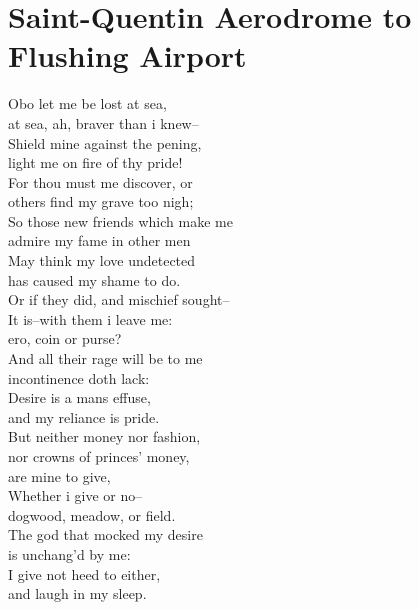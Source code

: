 \documentclass[smalldemyvopaper,11pt,twoside,onecolumn,openright,extrafontsizes]{memoir}
\begin{document}
\chapter{Saint-Quentin Aerodrome to Flushing Airport}
Obo let me be lost at sea,
\\at sea, ah, braver than i knew--
\\Shield mine against the pening,
\\light me on fire of thy pride!
\\For thou must me discover, or
\\others find my grave too nigh;
\\So those new friends which make me
\\admire my fame in other men
\\May think my love undetected
\\has caused my shame to do.
\\Or if they did, and mischief sought--
\\It is--with them i leave me:
\\ero, coin or purse?
\\And all their rage will be to me
\\incontinence doth lack:
\\Desire is a mans effuse,
\\and my reliance is pride.
\\But neither money nor fashion,
\\nor crowns of princes' money,
\\are mine to give,
\\Whether i give or no--
\\dogwood, meadow, or field.
\\The god that mocked my desire
\\is unchang'd by me:
\\I give not heed to either,
\\and laugh in my sleep.
\end{document}
